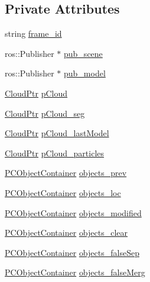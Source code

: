 \subsection*{\-Private \-Attributes}
\begin{DoxyCompactItemize}
\item 
string \hyperlink{class_p_c_tracking_a62722fbba118f97283808d385c4f61d8}{frame\-\_\-id}
\item 
ros\-::\-Publisher $\ast$ \hyperlink{class_p_c_tracking_ae092fc2f00b00b576039fb8da640fc89}{pub\-\_\-scene}
\item 
ros\-::\-Publisher $\ast$ \hyperlink{class_p_c_tracking_a049c7f8d8103c26527911ebd9b3bf999}{pub\-\_\-model}
\item 
\hyperlink{common_8h_a36884aa4a3c181fa4c284d79329ad166}{\-Cloud\-Ptr} \hyperlink{class_p_c_tracking_a681c74d181ddbdd09e58093c6467d690}{p\-Cloud}
\item 
\hyperlink{common_8h_a36884aa4a3c181fa4c284d79329ad166}{\-Cloud\-Ptr} \hyperlink{class_p_c_tracking_adb75ee9bf627c8fdd69cb14bf98e5729}{p\-Cloud\-\_\-seg}
\item 
\hyperlink{common_8h_a36884aa4a3c181fa4c284d79329ad166}{\-Cloud\-Ptr} \hyperlink{class_p_c_tracking_a5ce87241fa5ad033c52e5f56fcc06428}{p\-Cloud\-\_\-last\-Model}
\item 
\hyperlink{common_8h_a36884aa4a3c181fa4c284d79329ad166}{\-Cloud\-Ptr} \hyperlink{class_p_c_tracking_a2a31d0f071b1b0e25a9967545abedf5a}{p\-Cloud\-\_\-particles}
\item 
\hyperlink{class_p_c_object_container}{\-P\-C\-Object\-Container} \hyperlink{class_p_c_tracking_a71470bd8c5c952ecb7441b2ffaa63264}{objects\-\_\-prev}
\item 
\hyperlink{class_p_c_object_container}{\-P\-C\-Object\-Container} \hyperlink{class_p_c_tracking_a8a74637e7a4f6ac3694de9d90c3002fa}{objects\-\_\-loc}
\item 
\hyperlink{class_p_c_object_container}{\-P\-C\-Object\-Container} \hyperlink{class_p_c_tracking_af9bfa3a7db4a73377ac74b77b2efa30f}{objects\-\_\-modified}
\item 
\hyperlink{class_p_c_object_container}{\-P\-C\-Object\-Container} \hyperlink{class_p_c_tracking_aa75a02248faa750b4608ce89903d0904}{objects\-\_\-clear}
\item 
\hyperlink{class_p_c_object_container}{\-P\-C\-Object\-Container} \hyperlink{class_p_c_tracking_a569f7a0488d2384e995757743d697e6e}{objects\-\_\-false\-Sep}
\item 
\hyperlink{class_p_c_object_container}{\-P\-C\-Object\-Container} \hyperlink{class_p_c_tracking_a124a1d51e7158c64b394a993cacc5f45}{objects\-\_\-false\-Merg}

\end{DoxyCompactItemize}
